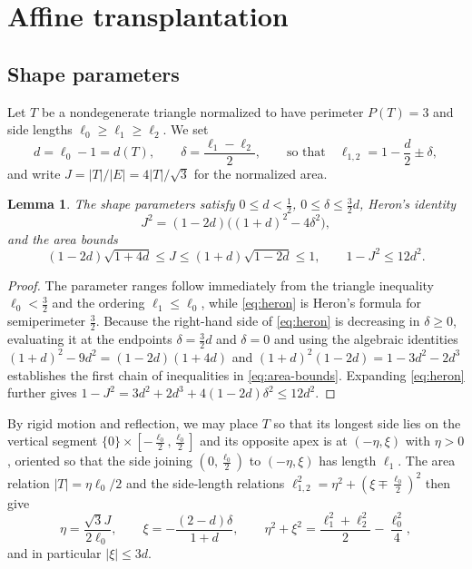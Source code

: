 \documentclass[11pt,reqno]{amsart}
\numberwithin{equation}{section}
\newtheorem{lemma}[lemma]{Lemma}
\theoremstyle{remark}
\begin{document}
\section{Affine transplantation}\label{sec:comparison}
\subsection{Shape parameters}
Let $T$ be a nondegenerate triangle normalized to have perimeter $P(T)=3$ and side
lengths $\ell_0\ge\ell_1\ge\ell_2$. We set
\[
 d=\ell_0-1=d(T),\qquad \delta=\frac{\ell_1-\ell_2}2,\qquad
 \text{so that}\quad \ell_{1,2}=1-\frac d2\pm\delta,
\]
and write $J=|T|/|E|=4|T|/\sqrt3$ for the normalized area.

\begin{lemma}\label{lem:geometry}
The shape parameters satisfy $0\le d<\frac12$, $0\le\delta\le\frac32d$, Heron's
identity
\begin{equation}\label{eq:heron}
 J^2=(1-2d)\bigl((1+d)^2-4\delta^2\bigr),
\end{equation}
and the area bounds
\begin{equation}\label{eq:area-bounds}
 (1-2d)\sqrt{1+4d}\le J\le(1+d)\sqrt{1-2d}\le1,
 \qquad 1-J^2\le12d^2.
\end{equation}
\end{lemma}
\begin{proof}
The parameter ranges follow immediately from the triangle inequality $\ell_0<\frac32$
and the ordering $\ell_1\le\ell_0$, while \eqref{eq:heron} is Heron's formula
for semiperimeter $\frac32$. Because the right-hand side of \eqref{eq:heron} is
decreasing in $\delta\ge0$, evaluating it at the endpoints $\delta=\frac32d$ and
$\delta=0$ and using the algebraic identities $(1+d)^2-9d^2=(1-2d)(1+4d)$ and
$(1+d)^2(1-2d)=1-3d^2-2d^3$ establishes the first chain of inequalities in
\eqref{eq:area-bounds}. Expanding \eqref{eq:heron} further gives
$1-J^2=3d^2+2d^3+4(1-2d)\delta^2\le12d^2$.
\end{proof}

By rigid motion and reflection, we may place $T$ so that its longest side lies on
the vertical segment $\{0\}\times[-\frac{\ell_0}2,\frac{\ell_0}2]$ and its
opposite apex is at $(-\eta,\xi)$ with $\eta>0$, oriented so that the side
joining $(0,\frac{\ell_0}2)$ to $(-\eta,\xi)$ has length $\ell_1$. The area
relation $|T|=\eta\ell_0/2$ and the side-length relations
$\ell_{1,2}^2=\eta^2+(\xi\mp\frac{\ell_0}2)^2$ then give
\begin{equation}\label{eq:apex}
 \eta=\frac{\sqrt3J}{2\ell_0},\qquad
 \xi=-\frac{(2-d)\delta}{1+d},\qquad
 \eta^2+\xi^2=\frac{\ell_1^2+\ell_2^2}2-\frac{\ell_0^2}4,
\end{equation}
and in particular $|\xi|\le3d$.
\end{document}
